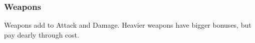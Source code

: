 \subsubsection*{Weapons}

Weapons add to Attack and Damage.
Heavier weapons have bigger bonuses, but pay dearly through  cost.

